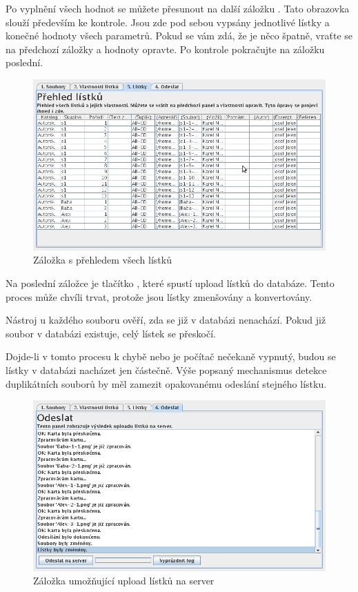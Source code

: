 Po vyplnění všech hodnot se můžete přesunout na další záložku . Tato obrazovka slouží především ke kontrole. Jsou zde pod sebou vypsány jednotlivé lístky a konečné hodnoty všech parametrů. Pokud se vám zdá, že je něco špatně, vraťte se na předchozí záložky a hodnoty opravte. Po kontrole pokračujte na záložku poslední.

\begin{figure}
\label{fig:u2c}
\centering
\includegraphics[width=\textwidth]{u2c.png}
\caption{Záložka s přehledem všech lístků}
\end{figure}

Na poslední záložce  je tlačítko , které spustí upload lístků do databáze. Tento proces může chvíli trvat, protože jsou lístky zmenšovány a konvertovány.

Nástroj u každého souboru ověří, zda se již v databázi nenachází. Pokud již soubor v databázi existuje, celý lístek se přeskočí.

{\color{OliveGreen} Dojde-li v tomto procesu k chybě nebo je počítač nečekaně vypnutý, budou se lístky v databázi nacházet jen částečně. Výše popsaný mechanismus detekce duplikátních souborů by měl zamezit opakovanému odeslání stejného lístku.}

\begin{figure}
\label{fig:u2d}
\centering
\includegraphics[width=\textwidth]{u2d.png}
\caption{Záložka umožňující upload lístků na server}
\end{figure}

